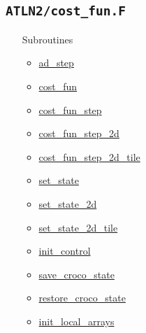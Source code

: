 \documentclass{article}
\begin{document}
\subsection{\texttt{ATLN2/cost\_fun.F}}
\begin{itemize}
\item[Subroutines]
  \begin{itemize}
  \item \hyperref[adstep]{ad\_step}
  \item \hyperref[costfun]{cost\_fun}
  \item \hyperref[costfunstep]{cost\_fun\_step}
  \item \hyperref[costfunstep]{cost\_fun\_step\_2d}
  \item \hyperref[costfunstep]{cost\_fun\_step\_2d\_tile}
  \item \hyperref[setstate]{set\_state}
  \item \hyperref[setstate]{set\_state\_2d}
  \item \hyperref[setstate]{set\_state\_2d\_tile}
  \item \hyperref[initcontrol]{init\_control}
  \item \hyperref[savecrocostate]{save\_croco\_state}
  \item \hyperref[restorecrocostate]{restore\_croco\_state}
  \item \hyperref[initlocalarrays]{init\_local\_arrays}
  \end{itemize}
\end{itemize}
\end{document}
